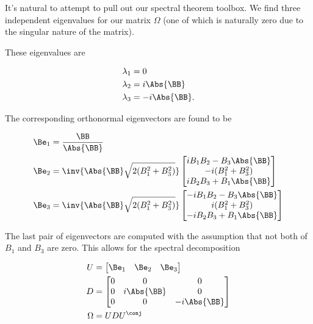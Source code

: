 It's natural to attempt to pull out our spectral theorem toolbox.  We find three independent eigenvalues for our matrix $\Omega$ (one of which is naturally zero due to the singular nature of the matrix).

These eigenvalues are

\begin{align}\label{eqn:lorentzRotation:420}
\lambda_1 &= 0 \\
\lambda_2 &= i\Abs{\BB} \\
\lambda_3 &= -i\Abs{\BB}.
\end{align}

The corresponding orthonormal eigenvectors are found to be

\begin{align}\label{eqn:lorentzRotation:440}
\Be_1 &= \frac{\BB}{\Abs{\BB}} \\
\Be_2 &=
\inv{\Abs{\BB} \sqrt{ 2(B_1^2 + B_3^2) } }
\begin{bmatrix}
i B_1 B_2 - B_3 \Abs{\BB} \\
-i(B_1^2 + B_3^2) \\
i B_2 B_3 + B_1 \Abs{\BB} \\
\end{bmatrix} \\
\Be_3 &=
\inv{\Abs{\BB} \sqrt{ 2(B_1^2 + B_3^2) } }
\begin{bmatrix}
-i B_1 B_2 - B_3 \Abs{\BB} \\
i(B_1^2 + B_3^2) \\
-i B_2 B_3 + B_1 \Abs{\BB} \\
\end{bmatrix}
\end{align}

The last pair of eigenvectors are computed with the assumption that not both of $B_1$ and $B_3$ are zero.  This allows for the spectral decomposition

\begin{align}\label{eqn:lorentzRotation:460}
U &=
\begin{bmatrix}
\Be_1 & \Be_2 & \Be_3
\end{bmatrix} \\
D &= \begin{bmatrix}
0 & 0 & 0 \\
0 & i \Abs{\BB} & 0 \\
0 & 0 & -i \Abs{\BB}
\end{bmatrix} \\
\Omega &= U D U^\conj
\end{align}

